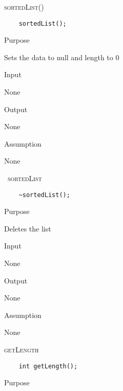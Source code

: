 \documentclass[pdftex, 11pt]{article}
\begin{document}
\begin{description}

	\item{\textsc{sortedList()}}
\begin{lstlisting}
	sortedList();
\end{lstlisting}

		\begin{description}

			\item{Purpose}

				Sets the data to null and length to 0

			\item{Input}

				None

			\item{Output}

				None

			\item{Assumption}

				None

		\end{description}

	\item{\textsc{~sortedList}}
\begin{lstlisting}
	~sortedList();
\end{lstlisting}

		\begin{description}

			\item{Purpose}

				Deletes the list

			\item{Input}

				None

			\item{Output}

				None

			\item{Assumption}

				None

		\end{description}

	\item{\textsc{getLength}}
\begin{lstlisting}
	int getLength();
\end{lstlisting}

		\begin{description}

			\item{Purpose}


\end{description}
\end{description}
\end{document}
